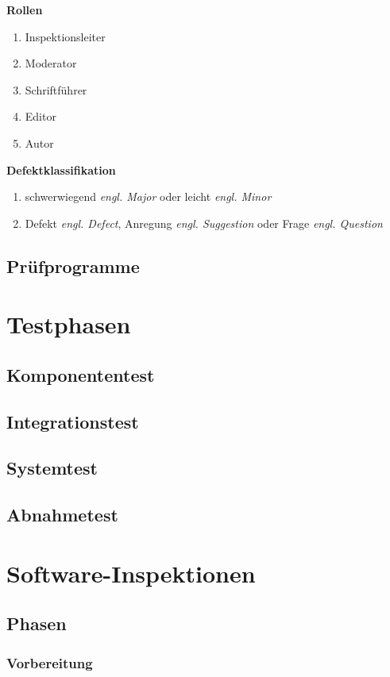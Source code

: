 \documentclass[a4paper]{article}
\theoremstyle{break}
\begin{document}
          \textbf{Rollen}
          \begin{enumerate}
          \item Inspektionsleiter
          \item Moderator
          \item Schriftf\"uhrer
          \item Editor
          \item Autor
          \end{enumerate}

          \textbf{Defektklassifikation}
          \begin{enumerate}
          \item schwerwiegend \textit{engl. Major} oder leicht \textit{engl. Minor}
            \item Defekt \textit{engl. Defect}, Anregung \textit{engl. Suggestion} oder Frage \textit{engl. Question}
          \end{enumerate}
          

              \subsection{Prüfprogramme}
        
\section{Testphasen}
\subsection{Komponententest}
\subsection{Integrationstest}
\subsection{Systemtest}
\subsection{Abnahmetest}
\section{Software-Inspektionen}
\subsection{Phasen}
\subsubsection{Vorbereitung}
\end{document}
